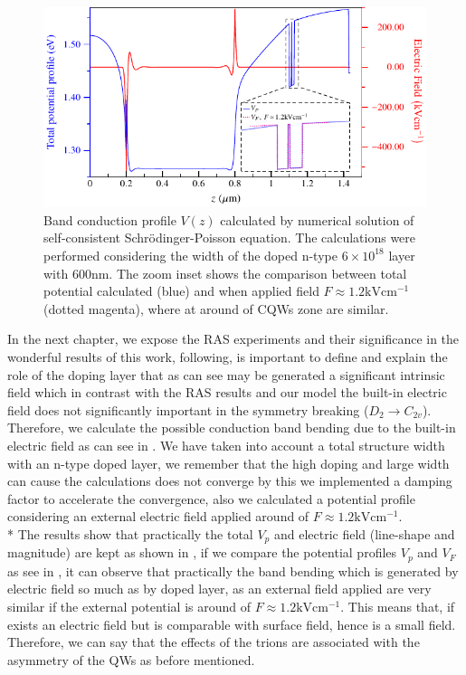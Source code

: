 \begin{figure}[ht!]
	\centering
	\includegraphics[width=\textwidth]{../figures/chapter-3/poisson/build/poisson-3.pdf}
	\caption{Band conduction profile $V(z)$ calculated by numerical solution of self-consistent Schr\"odinger-Poisson equation. The calculations were performed considering the width of the doped n-type $6\times 10^{18}$ layer with  600nm. The zoom inset shows the comparison between total potential calculated (blue) and when applied field $F\!\approx\! 1.2 \mathrm{kVcm^{-1}}$ (dotted magenta), where at around of CQWs zone are similar.}
	\label{fig:chapter-3-pr-poisson-3}
\end{figure}
In the next chapter, we expose the RAS experiments and their significance in the wonderful results of this work, following, is important to define and explain the role of the doping layer that as can see may be generated a significant intrinsic field which in contrast with the RAS results and our model the built-in electric field does not significantly  important in the symmetry breaking ($D_{2} \to C_{2v}$).  Therefore, we calculate the possible conduction band bending due to the built-in electric field as can see in .
We have taken into account a total structure width with an n-type doped layer,  we remember that the high doping and large width can cause the calculations does not converge by this we implemented a damping factor to accelerate the convergence, also we calculated a  potential profile considering an external electric field applied around of $F\!\approx\! 1.2 \mathrm{kVcm^{-1}}$. \\*
The results show that practically the total $V_p$ and electric field (line-shape and magnitude) are kept as shown in , if we compare the potential profiles $V_{p}$ and $V_{F}$ as see in , it can observe that practically the band bending which is generated by electric field so much as by doped layer, as an external field applied are very similar if the external potential is around of $F\!\approx\! 1.2 \mathrm{kVcm^{-1}}$. This means that, if exists an electric field but is comparable with surface field\cite{lastras1999model}, hence is a small field. 
Therefore, we can say that the effects of the trions are associated with the asymmetry of the \gls{QW}s as before mentioned.



